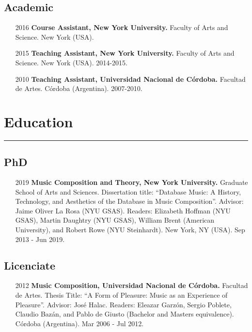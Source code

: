 \documentclass[12pt]{article}%
\begin{document}
\subsection{Academic}%
\begin{itemize}[align=parleft,leftmargin=2.25cm,labelwidth=2cm]
\item[2016]
\textbf{Course Assistant, New York University.}
Faculty of Arts and Science. 
New York (USA). 
\end{itemize}%
\begin{itemize}[align=parleft,leftmargin=2.25cm,labelwidth=2cm]
\item[2015]
\textbf{Teaching Assistant, New York University.}
Faculty of Arts and Science. 
New York (USA). 
2014{-}2015.
\end{itemize}%
\begin{itemize}[align=parleft,leftmargin=2.25cm,labelwidth=2cm]
\item[2010]
\textbf{Teaching Assistant, Universidad Nacional de Córdoba.}
Facultad de Artes. 
Córdoba (Argentina). 
2007{-}2010.
\end{itemize}

%
\section{Education}%
\label{sec:Education}%
\hrule%
\subsection{PhD}%
\begin{itemize}[align=parleft,leftmargin=2.25cm,labelwidth=2cm]
\item[2019]
\textbf{Music Composition and Theory, New York University.}
Graduate School of Arts and Sciences. 
Dissertation title: ``Database Music: A History, Technology, and Aesthetics of the Database in Music Composition''. Advisor: Jaime Oliver La Rosa (NYU GSAS). Readers: Elizabeth Hoffman (NYU GSAS), Martin Daughtry (NYU GSAS), William Brent (American University), and Robert Rowe (NYU Steinhardt). 
New York, NY (USA). 
Sep  2013 {-} Jun  2019.
\end{itemize}%
\subsection{Licenciate}%
\begin{itemize}[align=parleft,leftmargin=2.25cm,labelwidth=2cm]
\item[2012]
\textbf{Music Composition, Universidad Nacional de Córdoba.}
Facultad de Artes. 
Thesis Title: ``A Form of Pleasure: Music as an Experience of Pleasure''. Advisor: José Halac. Readers: Eleazar Garzón, Sergio Poblete, Claudio Bazán, and Pablo de Giusto (Bachelor and Masters equivalence). 
Córdoba (Argentina). 
Mar  2006 {-} Jul  2012.
\end{itemize}%
\pagebreak%
\end{document}
